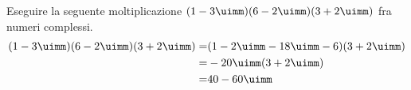 	Eseguire la seguente moltiplicazione $(1-3\uimm)(6-2\uimm)(3+2\uimm)$ fra numeri complessi.
	\begin{align*}
	(1-3\uimm)(6-2\uimm)(3+2\uimm)=&(1-2\uimm-18\uimm-6)(3+2\uimm)\\
	=&-20\uimm(3+2\uimm)\\
	=&40-60\uimm\\
	\end{align*}
